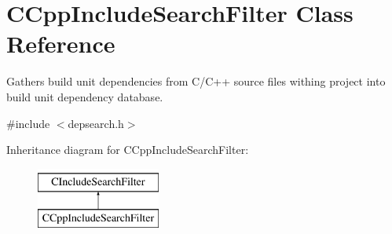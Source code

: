 \hypertarget{classCCppIncludeSearchFilter}{\section{C\-Cpp\-Include\-Search\-Filter Class Reference}
\label{classCCppIncludeSearchFilter}
}


Gathers build unit dependencies from C/\-C++ source files withing project into build unit dependency database.  




{\ttfamily \#include $<$depsearch.\-h$>$}

Inheritance diagram for C\-Cpp\-Include\-Search\-Filter\-:\begin{figure}[H]
\begin{center}
\leavevmode
\includegraphics[height=2.000000cm]{d3/d80/classCCppIncludeSearchFilter}
\end{center}
\end{figure}
